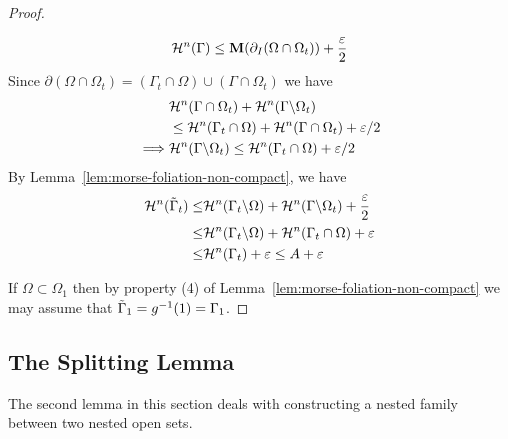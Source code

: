 \begin{lemma}
\begin{proof}
\begin{itemize}
\begin{equation*}
                \mathcal{H}^n(\Gamma) \leq \mathbf{M}(\partial_I(\Omega\cap\Omega_t)) + \frac{\varepsilon}{2}
            \end{equation*}
            Since $\partial(\Omega\cap \Omega_t) = (\Gamma_t\cap\Omega)\cup(\Gamma\cap\Omega_t)$ we have
            \begin{equation*}
                \begin{split}
                    &\mathcal{H}^n(\Gamma\cap\Omega_t) + \mathcal{H}^n(\Gamma\backslash\Omega_t) \\
                    &\leq \mathcal{H}^n(\Gamma_t\cap\Omega) + \mathcal{H}^n(\Gamma\cap\Omega_t) + \varepsilon/2\\
                    \implies & \mathcal{H}^n(\Gamma\backslash\Omega_t) \leq \mathcal{H}^n(\Gamma_t\cap\Omega) + \varepsilon/2
                \end{split}
            \end{equation*}
            By Lemma~\ref{lem:morse-foliation-non-compact}, we have
        \begin{equation*}
            \begin{split}
                \mathcal{H}^n(\Tilde{\Gamma}_t) \leq& \mathcal{H}^n(\Gamma_t\backslash \Omega) + \mathcal{H}^n(\Gamma\backslash\Omega_t) + \frac{\varepsilon}{2}\\
                \leq& \mathcal{H}^n(\Gamma_t\backslash \Omega) + \mathcal{H}^n(\Gamma_t\cap\Omega) + \varepsilon\\
                \leq& \mathcal{H}^n(\Gamma_t) + \varepsilon \leq A + \varepsilon
            \end{split}
        \end{equation*}
        \end{itemize}
        If $\Omega \subset \Omega_1$ then by property (4) of Lemma~\ref{lem:morse-foliation-non-compact} we may assume that $\Tilde{\Gamma}_1 = g^{-1}(1) = \Gamma_1$.
    \end{proof}
\end{lemma}

\subsection{The Splitting Lemma}\label{sec:splitting-lemma}

The second lemma in this section deals with constructing a nested family between two nested open sets.

